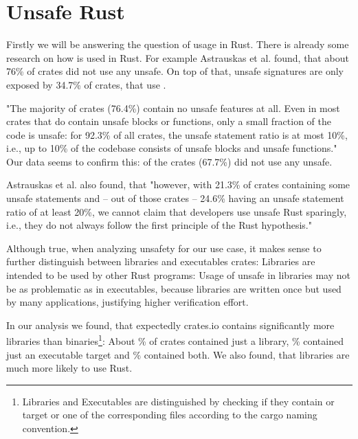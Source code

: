 \documentclass[twoside, english]{sdqthesis}
\theoremstyle{definition}
\begin{document}
\label{ss:unsafe-rust}\section{Unsafe Rust}

Firstly we will be answering the question of  usage in Rust.
There is already some research on how  is used in Rust. For example Astrauskas et al. \cite{astrauskas_how_2020} found, that about 76\% of crates did not use any unsafe. On top of that, unsafe signatures are only exposed by 34.7\% of crates, that use .

"The majority of crates (76.4\%) contain no unsafe features at all. Even in most crates that do contain unsafe blocks or functions, only a small fraction of the code is unsafe: for 92.3\% of all crates, the unsafe statement ratio is at most 10\%, i.e., up to 10\% of the codebase consists of unsafe blocks and unsafe functions." \cite[p. 13]{astrauskas_how_2020}
Our data seems to confirm this:  of the  crates (67.7\%) did not use any unsafe. 

Astrauskas et al. also found, that "however, with 21.3\% of crates containing some unsafe statements and – out of those crates – 24.6\% having an unsafe statement ratio of at least 20\%, we cannot claim that developers use unsafe Rust sparingly, i.e., they do not always follow the first principle of the Rust hypothesis." \cite[p. 14]{astrauskas_how_2020}

Although true, when analyzing unsafety for our use case, it makes sense to further distinguish between libraries and executables crates: Libraries are intended to be used by other Rust programs: Usage of unsafe in libraries may not be as problematic as in executables, because libraries are written once but used by many applications, justifying higher verification effort. 

In our analysis we found, that expectedly crates.io contains significantly more libraries than binaries\footnote{Libraries and Executables are distinguished by checking if they contain  or  target or one of the corresponding files according to the cargo naming convention.}: About \% of crates contained just a library, \% contained just an executable target and \% contained both. 
We also found, that libraries are much more likely to use  Rust.
\end{document}
